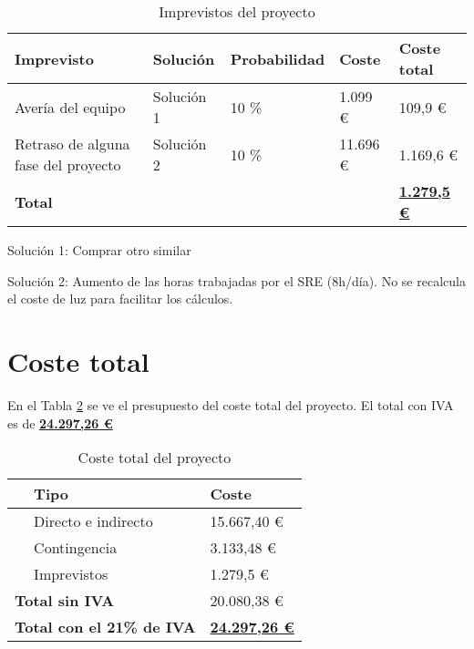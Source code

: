 \begin{table}[H]\label{tab:imprevistos}
	\centering
	\begin{tabular}{|l|l|l|l|l|}
		\hline
		Imprevisto                           & Solución   & Probabilidad     & Coste    & Coste total \\ \hline
		Avería del equipo                    & Solución 1 & 10 \%            & 1.099 €  & 109,9 €     \\ \hline
		Retraso de alguna fase del proyecto  & Solución 2 & 10 \%            & 11.696 € & 1.169,6 €   \\ \hline
		\multicolumn{4}{|l|}{\textbf{Total}} & \textbf{\underline{1.279,5 €}}                         \\ \hline
		                                                                        
	\end{tabular}
	\caption{Imprevistos del proyecto}
\end{table}

Solución 1: Comprar otro similar

Solución 2: Aumento de las horas trabajadas por el SRE (8h/día). No se recalcula el coste de luz para facilitar los cálculos.

\section{Coste total}

En el Tabla \ref{tab:totaltotal} se ve el presupuesto del coste total del proyecto. El total con IVA es de \textbf{\underline{24.297,26 €}}

\begin{table}[H]\label{tab:totaltotal}
	\centering
	\begin{tabular}{|l|l|l|}
		\hline
		\multirow{4}{*}{}    & \textbf{Tipo}                 & \textbf{Coste}       \\ \hline
		& Directo e indirecto   & 15.667,40 € \\ \hline
		& Contingencia          & 3.133,48 €  \\ \hline
		& Imprevistos           & 1.279,5 €   \\ \hline
		\multicolumn{2}{|l|}{\textbf{Total sin IVA}}            & 20.080,38 € \\ \hline
		\multicolumn{2}{|l|}{\textbf{Total con el 21\% de IVA}} & \textbf{\underline{24.297,26 €}} \\ \hline
	\end{tabular}
    \caption{Coste total del proyecto}
\end{table}




